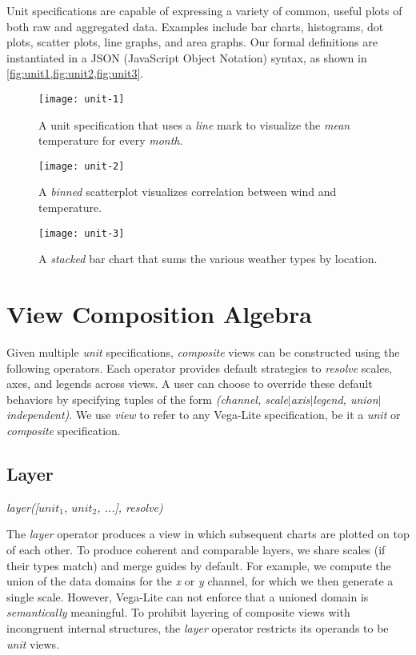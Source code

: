 Unit specifications are capable of expressing a variety of common, useful plots
of both raw and aggregated data. Examples include bar charts, histograms, dot
plots, scatter plots, line graphs, and area graphs. Our formal definitions are
instantiated in a JSON (JavaScript Object Notation) syntax, as shown in
\cref{fig:unit1,fig:unit2,fig:unit3}.

\begin{figure}[h!]
\centering
  \texttt{[image: unit-1]}
  \caption{A unit specification that uses a \emph{line} mark to visualize the
  \emph{mean} temperature for every \emph{month}.}
  \label{fig:unit1}
\end{figure}

\begin{figure}[h!]
  \centering
  \texttt{[image: unit-2]}
  \caption{A \emph{binned} scatterplot visualizes correlation between wind
  and temperature.}
  \label{fig:unit2}
\end{figure}

\begin{figure}[h!]
  \centering
  \texttt{[image: unit-3]}
  \caption{A \emph{stacked} bar chart that sums the various weather types by
  location.}
  \label{fig:unit3}
\end{figure}

\newpage
\section{View Composition Algebra}

Given multiple \emph{unit} specifications, \emph{composite} views can be
constructed using the following operators. Each operator provides default
strategies to \emph{resolve} scales, axes, and legends across views. A user can
choose to override these default behaviors by specifying tuples of the form
\emph{(channel, scale$|$axis$|$legend, union$|$independent)}. We use \emph{view}
to refer to any Vega-Lite specification, be it a \emph{unit} or \emph{composite}
specification.

\subsection{Layer}

\centerline{
  \emph{layer([$unit_1$, $unit_2$, ...], resolve)}
}

The \emph{layer} operator produces a view in which subsequent charts are plotted
on top of each other. To produce coherent and comparable layers, we share scales
(if their types match) and merge guides by default. For example, we compute the
union of the data domains for the \emph{x} or \emph{y} channel, for which we
then generate a single scale. However, Vega-Lite can not enforce that a unioned
domain is \emph{semantically} meaningful. To prohibit layering of composite
views with incongruent internal structures, the \emph{layer} operator restricts
its operands to be \emph{unit} views.

